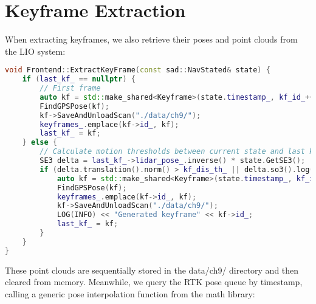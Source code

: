 \section{Keyframe Extraction}
When extracting keyframes, we also retrieve their poses and point clouds from the LIO system:
\begin{lstlisting}[language=c++,caption=src/ch9/frontend.cc]
void Frontend::ExtractKeyFrame(const sad::NavStated& state) {
	if (last_kf_ == nullptr) {
		// First frame
		auto kf = std::make_shared<Keyframe>(state.timestamp_, kf_id_++, state.GetSE3(), lio_->GetCurrentScan());
		FindGPSPose(kf);
		kf->SaveAndUnloadScan("./data/ch9/");
		keyframes_.emplace(kf->id_, kf);
		last_kf_ = kf;
	} else {
		// Calculate motion thresholds between current state and last keyframe
		SE3 delta = last_kf_->lidar_pose_.inverse() * state.GetSE3();
		if (delta.translation().norm() > kf_dis_th_ || delta.so3().log().norm() > kf_ang_th_deg_ * math::kDEG2RAD) {
			auto kf = std::make_shared<Keyframe>(state.timestamp_, kf_id_++, state.GetSE3(), lio_->GetCurrentScan());
			FindGPSPose(kf);
			keyframes_.emplace(kf->id_, kf);
			kf->SaveAndUnloadScan("./data/ch9/");
			LOG(INFO) << "Generated keyframe" << kf->id_;
			last_kf_ = kf;
		}
	}
}
\end{lstlisting}

These point clouds are sequentially stored in the data/ch9/ directory and then cleared from memory. Meanwhile, we query the RTK pose queue by timestamp, calling a generic pose interpolation function from the math library:


